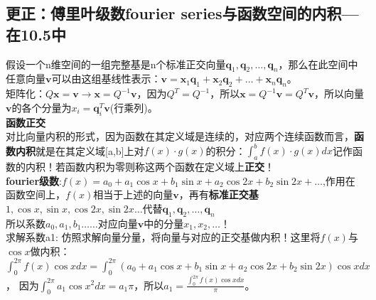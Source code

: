     \subsection{更正：傅里叶级数fourier series与函数空间的内积---在10.5中}
    假设一个n维空间的一组完整基是n个标准正交向量$\bm{q}_{1}, \bm{q}_{2}, \dots ,\bm{q}_{n}$，那么在此空间中任意向量$\bm{v}$可以由这组基线性表示：$\bm{v}=\bm{x}_{1} \bm{q}_{1}+\bm{x}_{2} \bm{q}_{2}+\ldots +\bm{x}_{n} \bm{q}_{n}$。\\
    矩阵化：$Q \bm{x}=\bm{v} \rightarrow \bm{x}=Q^{-1} \bm{v}$，因为$Q^{T}=Q^{-1}$，所以$\bm{x}=Q^{-1} \bm{v}=Q^{T} \bm{v}$，所以向量$\bm{v}$的各个分量为$x_{i} = \bm{q}_{i}^{T} \bm{v}$(行乘列)。\\
    \textbf{函数正交}\\
    对比向量内积的形式，因为函数在其定义域是连续的，对应两个连续函数而言，\textbf{函数内积}就是在其定义域[a,b]上对$f(x) \cdot g(x)$的积分：$ \int_{a}^{b}f(x) \cdot g(x)dx$记作函数的内积！若函数内积为零则称这两个函数在定义域上\textbf{正交}！\\
    \textbf{fourier级数}:$f(x)=a_{0}+a_{1} \cos x+b_{1} \sin x+a_{2} \cos 2 x+b_{2} \sin 2 x+\ldots$,作用在函数空间上，$f(x)$相当于上述的向量$\bm{v}$，再有\textbf{标准正交基}$1, \cos x, \sin x, \cos 2 x, \sin 2 x \ldots$代替$\boldsymbol{q}_{1}, \boldsymbol{q}_{2}, \dots, \boldsymbol{q}_{n}$
    \\
    所以系数$a_{0}, a_{1}, b_{1} \dots \dots$对应向量$\bm{v}$中的分量$x_{1}, x_{2}, \dots$！\\
    求解系数a1: 仿照求解向量分量，将向量与对应的正交基做内积！这里将$f(x)$与$\cos x$做内积：$\int_{0}^{2 \pi} f(x) \cos x d x=\int_{0}^{2 \pi}\left(a_{0}+a_{1} \cos x+b_{1} \sin x+a_{2} \cos 2 x+b_{2} \sin 2 x\right) \cos x d x$， 因为$\int_{0}^{2 \pi} a_{1} \cos x^{2} d x=a_{1} \pi$，所以$a_{1}=\frac{\int_{0}^{2 \pi} f(x) \cos x d x}{\pi}$。
